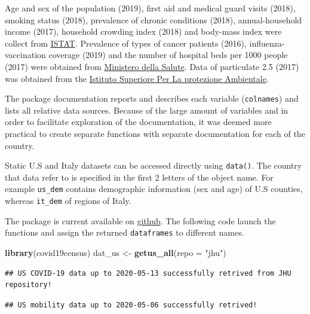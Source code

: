 \documentclass[12pt,halfline,a4paper,]{ouparticle}
\newenvironment{Shaded}{\begin{snugshade}}{\end{snugshade}}
\newcommand{\DataTypeTok}[1]{\textcolor[rgb]{0.13,0.29,0.53}{#1}}
\newcommand{\KeywordTok}[1]{\textcolor[rgb]{0.13,0.29,0.53}{\textbf{#1}}}
\newcommand{\NormalTok}[1]{#1}
\newcommand{\StringTok}[1]{\textcolor[rgb]{0.31,0.60,0.02}{#1}}
\begin{document}
Age and sex of the population (2019), first aid and medical guard visits
(2018), smoking status (2018), prevalence of chronic conditions (2018),
annual-household income (2017), household crowding index (2018) and
body-mass index were collect from
\href{http://dati.istat.it/?lang=en}{ISTAT}. Prevalence of types of
cancer patients (2016), influenza-vaccination coverage (2019) and the
number of hospital beds per 1000 people (2017) were obtained from
\href{http://www.dati.salute.gov.it/}{Ministero della Salute}. Data of
particulate 2.5 (2017) was obtained from the
\href{https://annuario.isprambiente.it/pon/basic/14}{Istituto Superiore
Per La protezione Ambientale}.

The package documentation reports and describes each variable
(\texttt{colnames}) and lists all relative data sources. Because of the
large amount of variables and in order to facilitate exploration of the
documentation, it was deemed more practical to create separate functions
with separate documentation for each of the country.

Static U.S and Italy datasets can be accessed directly using
\texttt{data()}. The country that data refer to is specified in the
first 2 letters of the object name. For example \texttt{us\_dem}
contains demographic information (sex and age) of U.S counties, whereas
\texttt{it\_dem} of regions of Italy.

The package is current available on
\href{https://github.com/c1au6i0/covid19census}{github}. The following
code launch the functions and assign the returned \texttt{dataframes} to
different names.

\bigskip

\begin{Shaded}
\begin{Highlighting}[]
\KeywordTok{library}\NormalTok{(covid19census)}
\NormalTok{dat_us <-}\StringTok{ }\KeywordTok{getus_all}\NormalTok{(}\DataTypeTok{repo =} \StringTok{"jhu"}\NormalTok{)}
\end{Highlighting}
\end{Shaded}

\begin{verbatim}
## US COVID-19 data up to 2020-05-13 successfully retrived from JHU repository!
\end{verbatim}

\begin{verbatim}
## US mobility data up to 2020-05-06 successfully retrived!
\end{verbatim}
\end{document}
